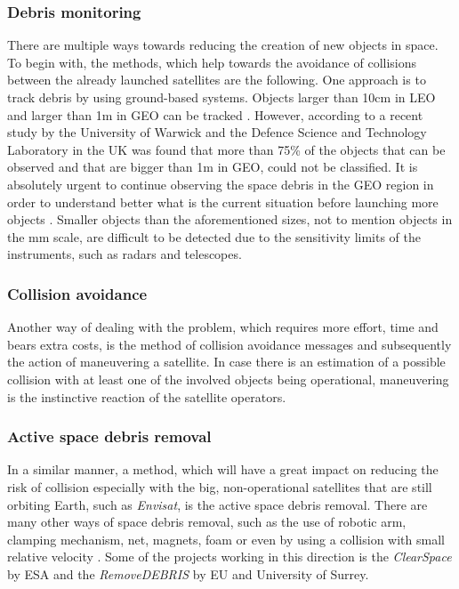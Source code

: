 \subsubsection{Debris monitoring}
There are multiple ways towards reducing the creation of new objects in space. %
To begin with, the methods, which help towards the avoidance of collisions between the already launched satellites are the following. One approach is to track debris by using ground-based systems. Objects larger than 10cm in LEO and larger than 1m in GEO can be tracked \cite{Kramer 2002}. However, according to a recent study by the University of Warwick and the Defence Science and Technology Laboratory in the UK was found that more than 75\% of the objects that can be observed and that are bigger than 1m in GEO, could not be classified. It is absolutely urgent to continue observing the space debris in the GEO region in order to understand better what is the current situation before launching more objects \cite{Blake}. %
 Smaller objects than the aforementioned sizes, not to mention objects in the mm scale, are difficult to be detected due to the sensitivity limits of the instruments, such as radars and telescopes.

\bigskip
\subsubsection{Collision avoidance}
Another way of dealing with the problem, which requires more effort, time and bears extra costs, is the method of collision avoidance messages and subsequently the action of maneuvering a satellite. In case there is an estimation of a possible collision with at least one of the involved objects being operational, maneuvering is the instinctive reaction of the satellite operators.

\bigskip
\subsubsection{Active space debris removal}
In a similar manner, a method, which will have a great impact on reducing the risk of collision especially with the big, non-operational satellites that are still orbiting Earth, such as \textit{Envisat}, is the active space debris removal. There are many other ways of space debris removal, such as the use of robotic arm, clamping mechanism, net, magnets, foam or even by using a collision with small relative velocity \cite{active, takeichi}. Some of the projects working in this direction is the \textit{ClearSpace} by ESA and the \textit{RemoveDEBRIS} by EU and University of Surrey.

